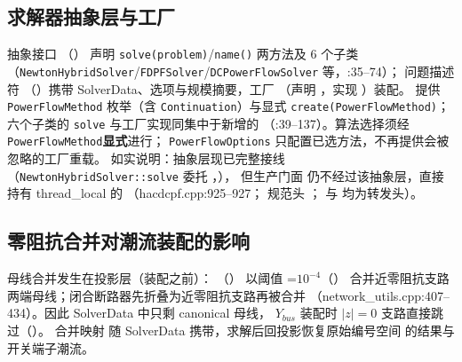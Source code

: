 \subsection{求解器抽象层与工厂}
抽象接口 （）
声明 \texttt{solve(problem)}/\texttt{name()} 两方法及 6 个子类
（\texttt{NewtonHybridSolver}/\allowbreak\texttt{FDPFSolver}/\allowbreak\texttt{DCPowerFlowSolver} 等，:35--74）；
问题描述符 （）携带
SolverData、选项与规模摘要，工厂 
（声明 ，实现
）装配。
 提供 \texttt{PowerFlowMethod} 枚举（含
\texttt{Continuation}）与显式 \texttt{create(PowerFlowMethod)}；六个子类的 \texttt{solve}
与工厂实现同集中于新增的 
（:39--137）。算法选择须经 \texttt{PowerFlowMethod}\textbf{显式}进行；
\texttt{PowerFlowOptions} 只配置已选方法，不再提供会被忽略的工厂重载。
如实说明：抽象层现已完整接线（\texttt{NewtonHybridSolver::\allowbreak solve}
委托 ，），
但生产门面  仍不经过该抽象层，直接持有
thread\_local 的 （hacdcpf.cpp:925--927；
规范头 ；
 与 
均为转发头）。

\subsection{零阻抗合并对潮流装配的影响}
母线合并发生在投影层（装配之前）：
（）
以阈值 =$10^{-4}$（）
合并近零阻抗支路两端母线；闭合断路器先折叠为近零阻抗支路再被合并
（network\_utils.cpp:407--434）。因此 SolverData 中只剩 canonical 母线，
$Y_{bus}$ 装配时 $|z|=0$ 支路直接跳过（）。
合并映射  随 SolverData 携带，求解后回投影恢复原始编号空间
的结果与开关端子潮流。


